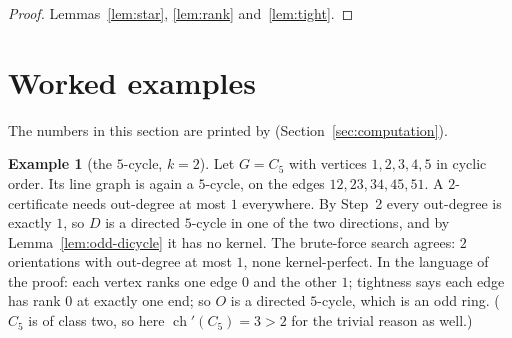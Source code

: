 \documentclass[11pt]{article}
\theoremstyle{plain}
\theoremstyle{definition}
\newtheorem{example}[theorem]{Example}
\theoremstyle{remark}
\newcommand{\chil}{\operatorname{ch}'}
\begin{document}
\begin{proof}
Lemmas~\ref{lem:star}, \ref{lem:rank} and~\ref{lem:tight}.
\end{proof}

\section{Worked examples}\label{sec:examples}

The numbers in this section are printed by 
(Section~\ref{sec:computation}).

\begin{example}[the $5$-cycle, $k=2$]\label{ex:c5}
Let $G=C_5$ with vertices $1,2,3,4,5$ in cyclic order. Its line graph is again a $5$-cycle, on
the edges $12,23,34,45,51$. A $2$-certificate needs out-degree at most $1$ everywhere. By
Step~2 every out-degree is exactly $1$, so $D$ is a directed $5$-cycle in one of the two
directions, and by Lemma~\ref{lem:odd-dicycle} it has no kernel. The brute-force search agrees:
$2$ orientations with out-degree at most $1$, none kernel-perfect. In the language of the proof:
each vertex ranks one edge $0$ and the other $1$; tightness says each edge has rank $0$ at
exactly one end; so $O$ is a directed $5$-cycle, which is an odd ring. ($C_5$ is of class two,
so here $\chil(C_5)=3>2$ for the trivial reason as well.)
\end{example}
\end{document}
